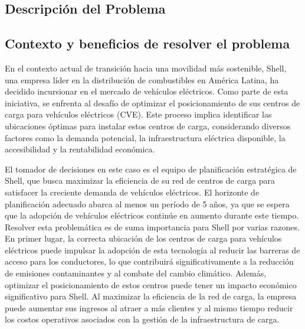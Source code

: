 \documentclass[letterpaper]{article}
\begin{document}
	\newpage
	\begin{flushleft}
		
		\section{Descripción del Problema}
		\subsection{Contexto y beneficios de resolver el problema}
		En el contexto actual de transición hacia una movilidad más sostenible, Shell, una empresa líder en la distribución de combustibles en América Latina, ha decidido incursionar en el mercado de vehículos eléctricos. Como parte de esta iniciativa, se enfrenta al desafío de optimizar el posicionamiento de sus centros de carga para vehículos eléctricos (CVE). Este proceso implica identificar las ubicaciones óptimas para instalar estos centros de carga, considerando diversos factores como la demanda potencial, la infraestructura eléctrica disponible, la accesibilidad y la rentabilidad económica. 
		\newline
		
		El tomador de decisiones en este caso es el equipo de planificación estratégica de Shell, que busca maximizar la eficiencia de su red de centros de carga para satisfacer la creciente demanda de vehículos eléctricos. El horizonte de planificación adecuado abarca al menos un período de 5 años, ya que se espera que la adopción de vehículos eléctricos continúe en aumento durante este tiempo. 
		\newline
		Resolver esta problemática es de suma importancia para Shell por varias razones. En primer lugar, la correcta ubicación de los centros de carga para vehículos eléctricos puede impulsar la adopción de esta tecnología al reducir las barreras de acceso para los conductores, lo que contribuirá significativamente a la reducción de emisiones contaminantes y al combate del cambio climático.
		\newline
		\newline
		Además, optimizar el posicionamiento de estos centros puede tener un impacto económico significativo para Shell. Al maximizar la eficiencia de la red de carga, la empresa puede aumentar sus ingresos al atraer a más clientes y al mismo tiempo reducir los costos operativos asociados con la gestión de la infraestructura de carga. 
		\newline

\end{flushleft}
\end{document}
